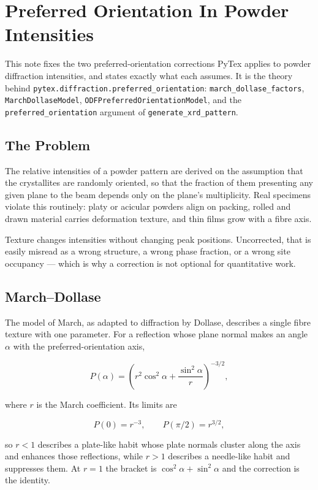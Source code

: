 \section{Preferred Orientation In Powder Intensities}

This note fixes the two preferred-orientation corrections PyTex applies to
powder diffraction intensities, and states exactly what each assumes. It is the
theory behind \texttt{pytex.diffraction.preferred\_orientation}:
\texttt{march\_dollase\_factors}, \texttt{MarchDollaseModel},
\texttt{ODFPreferredOrientationModel}, and the
\texttt{preferred\_orientation} argument of \texttt{generate\_xrd\_pattern}.

\subsection{The Problem}

The relative intensities of a powder pattern are derived on the assumption that
the crystallites are randomly oriented, so that the fraction of them presenting
any given plane to the beam depends only on the plane's multiplicity. Real
specimens violate this routinely: platy or acicular powders align on packing,
rolled and drawn material carries deformation texture, and thin films grow with
a fibre axis.

Texture changes intensities without changing peak positions. Uncorrected, that
is easily misread as a wrong structure, a wrong phase fraction, or a wrong site
occupancy --- which is why a correction is not optional for quantitative work.

\subsection{March--Dollase}

The model of March, as adapted to diffraction by Dollase, describes a single
fibre texture with one parameter. For a reflection whose plane normal makes an
angle $\alpha$ with the preferred-orientation axis,

\[
  P(\alpha) = \left( r^{2}\cos^{2}\alpha
                     + \frac{\sin^{2}\alpha}{r} \right)^{-3/2},
\]

where $r$ is the March coefficient. Its limits are

\[
  P(0) = r^{-3}, \qquad P(\pi/2) = r^{3/2},
\]

so $r < 1$ describes a plate-like habit whose plate normals cluster along the
axis and enhances those reflections, while $r > 1$ describes a needle-like habit
and suppresses them. At $r = 1$ the bracket is $\cos^2\alpha + \sin^2\alpha$ and
the correction is the identity.

